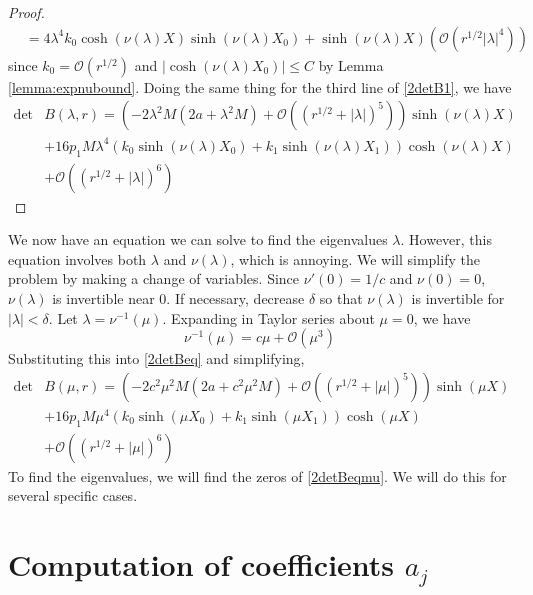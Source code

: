 \documentclass[thesis.tex]{subfiles}
\begin{document}
\begin{lemma}
\begin{proof}
\begin{align*}
&= 4 \lambda^4 k_0 \cosh(\nu(\lambda)X)\sinh(\nu(\lambda)X_0) + \sinh(\nu(\lambda)X)(\mathcal{O}(r^{1/2}|\lambda|^4))
\end{align*}
since $k_0 = \mathcal{O}(r^{1/2})$ and $|\cosh(\nu(\lambda)X_0)|\leq C$ by Lemma \ref{lemma:expnubound}. Doing the same thing for the third line of \cref{2detB1}, we have
\begin{equation*}
\begin{aligned}
\det &B(\lambda, r) = \left(-2 \lambda^2 M (2a + \lambda^2 M) +  \mathcal{O}( (r^{1/2} + |\lambda|)^5 )\right) \sinh(\nu(\lambda)X) \\
&+16 p_1 M \lambda^4 ( k_0\sinh(\nu(\lambda)X_0) + k_1 \sinh(\nu(\lambda)X_1) ) \cosh(\nu(\lambda)X)  \\
&+ \mathcal{O}( (r^{1/2} + |\lambda|)^6) 
\end{aligned}
\end{equation*}
\end{proof}
\end{lemma}

We now have an equation we can solve to find the eigenvalues $\lambda$. However, this equation involves both $\lambda$ and $\nu(\lambda)$, which is annoying. We will simplify the problem by making a change of variables. Since $\nu'(0) = 1/c$ and $\nu(0) = 0$, $\nu(\lambda)$ is invertible near 0. If necessary, decrease $\delta$ so that $\nu(\lambda)$ is invertible for $|\lambda| < \delta$. Let $\lambda = \nu^{-1}(\mu)$. Expanding in Taylor series about $\mu = 0$, we have
\[
\nu^{-1}(\mu) = c \mu + \mathcal{O}(\mu^3)
\]
Substituting this into \cref{2detBeq} and simplifying, 
\begin{equation}\label{2detBeqmu}
\begin{aligned}
\det &B(\mu, r) = \left(-2 c^2 \mu^2 M (2a + c^2 \mu^2 M) +  \mathcal{O}( (r^{1/2} + |\mu|)^5 )\right) \sinh(\mu X) \\
&+16 p_1 M \mu^4 ( k_0\sinh(\mu X_0) + k_1 \sinh(\mu X_1) ) \cosh(\mu X)  \\
&+ \mathcal{O}( (r^{1/2} + |\mu|)^6) 
\end{aligned}
\end{equation}
To find the eigenvalues, we will find the zeros of \cref{2detBeqmu}. We will do this for several specific cases.

\section{Computation of coefficients $a_j$}
\end{document}
